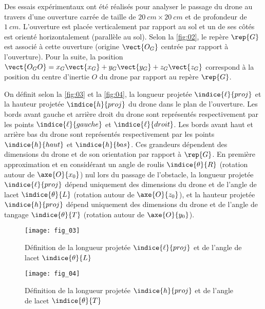 Des essais expérimentaux ont été réalisés pour analyser le passage du drone au travers
d’une ouverture carrée de taille de $\SI{20}{cm} \times \SI{20}{cm}$ et de profondeur de $\SI{1}{cm}$. L’ouverture est placée verticalement par rapport au sol et un de ses côtés est orienté horizontalement
(parallèle au sol). Selon la \autoref{fig:02}, le repère $\rep{G}$ est associé à cette ouverture 
(origine $\vect{O_G}$ centrée par rapport à l’ouverture). Pour la suite, la position 
$\vect{O_G O} = x_G \vect{x_G}+y_G \vect{y_G}+z_G \vect{z_G}$
 correspond à la position du centre d’inertie $O$ du drone par rapport au repère $\rep{G}$.

On définit selon la \autoref{fig:03} et la \autoref{fig:04}, la longueur projetée $\indice{\ell}{proj}$ et la hauteur projetée $\indice{h}{proj}$ du
drone dans le plan de l’ouverture. Les bords avant gauche et arrière droit du drone sont
représentés respectivement par les points $\indice{\ell}{gauche}$ et $\indice{\ell}{droit}$. Les bords avant haut et arrière bas
du drone sont représentés respectivement par les points $\indice{h}{haut}$ et $\indice{h}{bas}$.
Ces grandeurs dépendent des dimensions du drone et de son orientation par rapport à $\rep{G}$. En
première approximation et en considérant un angle de roulis $\indice{\theta}{R}$ (rotation autour de $\axe{O}{x_0}$) nul
lors du passage de l’obstacle, la longueur projetée $\indice{\ell}{proj}$ dépend uniquement des dimensions
du drone et de l’angle de lacet $\indice{\theta}{L}$ (rotation autour de $\axe{O}{z_0}$), et la hauteur projetée $\indice{h}{proj}$ dépend
uniquement des dimensions du drone et de l’angle de tangage $\indice{\theta}{T}$ (rotation autour de $\axe{O}{y_0}$).


\noindent
\begin{minipage}[c]{.48\linewidth}
\begin{figure}[H]
\centering
\texttt{[image: fig\_03]}
\caption{\label{fig:03} ­Définition de la longueur projetée $\indice{\ell}{proj}$ et de l’angle de lacet $\indice{\theta}{L}$}
\end{figure}
\end{minipage}\hspace{.5cm}
\begin{minipage}[c]{.48\linewidth}
\begin{figure}[H]
\centering
\texttt{[image: fig\_04]}
\caption{\label{fig:04} ­Définition de la longueur projetée $\indice{h}{proj}$ et de l’angle de lacet $\indice{\theta}{T}$}
\end{figure}
\end{minipage}

